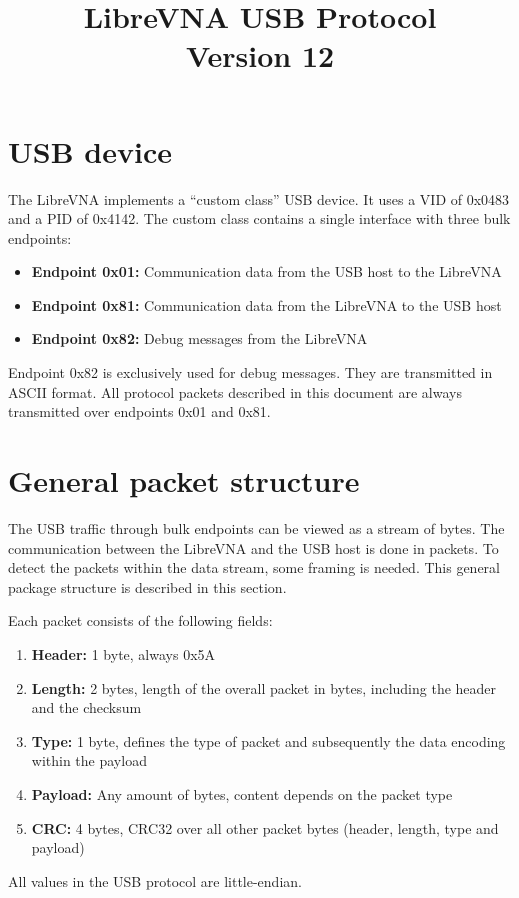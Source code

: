 \documentclass[a4paper,11pt]{article}
\title{LibreVNA USB Protocol\\\small{Version 12}}
\begin{document}
\maketitle
\tableofcontents
\clearpage

\section{USB device}
The LibreVNA implements a ``custom class'' USB device. It uses a VID of 0x0483 and a PID of 0x4142. The custom class contains a single interface with three bulk endpoints:
\begin{itemize}
\item \textbf{Endpoint 0x01:} Communication data from the USB host to the LibreVNA
\item \textbf{Endpoint 0x81:} Communication data from the LibreVNA to the USB host
\item \textbf{Endpoint 0x82:} Debug messages from the LibreVNA
\end{itemize}

Endpoint 0x82 is exclusively used for debug messages. They are transmitted in ASCII format. All protocol packets described in this document are always transmitted over endpoints 0x01 and 0x81.

\section{General packet structure}
The USB traffic through bulk endpoints can be viewed as a stream of bytes. The communication between the LibreVNA and the USB host is done in packets. To detect the packets within the data stream, some framing is needed. This general package structure is described in this section.

Each packet consists of the following fields:
\begin{enumerate}
\item \textbf{Header:} 1 byte, always 0x5A
\item \textbf{Length:} 2 bytes, length of the overall packet in bytes, including the header and the checksum
\item \textbf{Type:} 1 byte, defines the type of packet and subsequently the data encoding within the payload
\item \textbf{Payload:} Any amount of bytes, content depends on the packet type
\item \textbf{CRC:} 4 bytes, CRC32 over all other packet bytes (header, length, type and payload)
\end{enumerate}
\noindent
All values in the USB protocol are little-endian.
\end{document}

